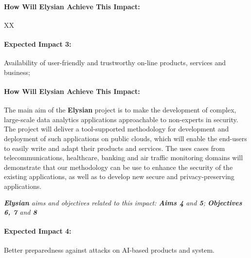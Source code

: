 \documentclass[a4paper,11pt]{article}
\newcommand{\project}[1]{\textbf{#1}\xspace}
\newcommand{\SECURITY}{\project{Elysian}}
\newcommand{\TheProject}{\SECURITY}
\begin{document}
\begin{mdframed}[backgroundcolor=gray!10]
\paragraph{How Will \TheProject{} Achieve This Impact:}
XX
\end{mdframed}

\begin{mdframed}[backgroundcolor=blue!5]
\paragraph{Expected Impact 3:}
Availability of user-friendly and trustworthy on-line products, services and business;
\end{mdframed}

\begin{mdframed}[backgroundcolor=gray!10]
\paragraph{How Will \TheProject{} Achieve This Impact:}
The main aim of the \TheProject{} project is to make the development of complex, large-scale data analytics applications approachable to non-experts in security. The project will deliver a tool-supported methodology for development and deployment of such applications on public clouds, which will enable the end-users to easily write and adapt their products and services. The uses cases from telecommunications, healthcare, banking and air traffic monitoring domains will demonstrate that our methodology can be use to enhance the security of the existing applications, as well as to develop new secure and privacy-preserving applications.

\emph{\TheProject{} aims and objectives related to this impact: \textbf{Aims 4}  and \textbf{5}; \textbf{Objectives 6, 7} and \textbf{8} }

\end{mdframed}

\begin{mdframed}[backgroundcolor=blue!5]
\paragraph{Expected Impact 4:}
Better preparedness against attacks on AI-based products and system.
\end{mdframed}
\end{document}
